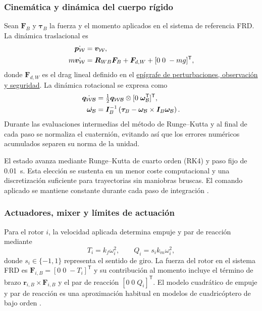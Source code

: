 \subsubsection*{Cinemática y dinámica del cuerpo rígido}
\label{subsubsec:cinematica-dinamica-cuerpo}

Sean $\bm{F}_B$ y $\bm{\tau}_B$ la fuerza y el momento aplicados en el sistema
de referencia FRD. La dinámica traslacional es
\begin{align}
 \dot{\bm{p}_{\mathcal{W}}} &= \bm{v}_{\mathcal{W}},\\
 m\dot{\bm{v}_{\mathcal{W}}} &= \bm{R}_{WB}\bm{F}_B+\bm{F}_{d,W}
                 +[0\;0\;-mg]^\mathsf{T},
 \label{eq:dinamica-traslacional}
\end{align}
donde $\bm{F}_{d,W}$ es el drag lineal definido en el
\hyperref[subsubsec:perturbaciones-observacion-seguridad]{epígrafe de
perturbaciones, observación y seguridad}. La dinámica rotacional se expresa como
\begin{align}
 \dot{\bm{q}_{\mathcal{W}\mathcal{B}}} &= \tfrac{1}{2}\bm{q}_{\mathcal{W}\mathcal{B}}\otimes[0\;\bm{\omega}_{\mathcal{B}}^\mathsf{T}]^\mathsf{T},\\
 \dot{\bm{\omega}_{\mathcal{B}}} &= \bm{I}_B^{-1}
 \left(\bm{\tau}_B-\bm{\omega}_{\mathcal{B}}\times\bm{I}_B\bm{\omega}_{\mathcal{B}}\right).
 \label{eq:dinamica-rotacional}
\end{align}
Durante las evaluaciones intermedias del método de Runge--Kutta y al final de
cada paso se normaliza el cuaternión, evitando así que los errores numéricos
acumulados separen su norma de la unidad.

El estado avanza mediante Runge--Kutta de cuarto orden (RK4) y paso fijo de
\SI{0.01}{s}. Esta elección se sustenta en un menor coste computacional y una
discretización suficiente para trayectorias sin maniobras bruscas. El comando
aplicado se mantiene constante durante cada paso de integración \cite{butcher2016numerical}.

\subsubsection*{Actuadores, mixer y límites de actuación}
\label{subsubsec:actuadores-mixer}

Para el rotor $i$, la velocidad aplicada determina empuje y par de reacción
mediante
\begin{equation}
 T_i=k_f\omega_i^2,\qquad Q_i=s_i k_m\omega_i^2,
 \label{eq:rotor-cuadratico}
\end{equation}
donde $s_i\in\{-1,1\}$ representa el sentido de giro. La fuerza del rotor en
el sistema FRD es $\bm{F}_{i,B}=[0\;0\;-T_i]^\mathsf{T}$ y su contribución al 
momento incluye el término de brazo $\bm{r}_{i,B}\times\bm{F}_{i,B}$ y el par de
reacción $[0\;0\;Q_i]^\mathsf{T}$. El modelo cuadrático de empuje y par de 
reacción es una aproximación habitual en modelos de cuadricóptero de bajo orden \cite{beard2012small,mellinger2011minimum}.

